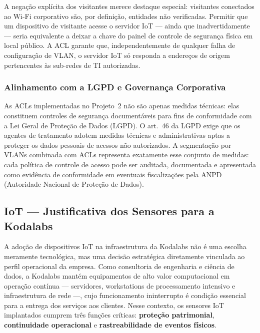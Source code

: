 \documentclass[12pt,a4paper]{article}
\begin{document}
A negação explícita dos visitantes merece destaque especial: visitantes conectados
ao Wi-Fi corporativo são, por definição, entidades não verificadas. Permitir que
um dispositivo de visitante acesse o servidor IoT — ainda que inadvertidamente —
seria equivalente a deixar a chave do painel de controle de segurança física em
local público. A ACL garante que, independentemente de qualquer falha de
configuração de VLAN, o servidor IoT só responda a endereços de origem pertencentes
às sub-redes de TI autorizadas.

\subsubsection{Alinhamento com a LGPD e Governança Corporativa}

As ACLs implementadas no Projeto~2 não são apenas medidas técnicas: elas constituem
controles de segurança documentáveis para fins de conformidade com a Lei Geral de
Proteção de Dados (LGPD). O art.~46 da LGPD exige que os agentes de tratamento
adotem medidas técnicas e administrativas aptas a proteger os dados pessoais de
acessos não autorizados. A segmentação por VLANs combinada com ACLs representa
exatamente esse conjunto de medidas: cada política de controle de acesso pode ser
auditada, documentada e apresentada como evidência de conformidade em eventuais
fiscalizações pela ANPD (Autoridade Nacional de Proteção de Dados).

\subsection{IoT — Justificativa dos Sensores para a Kodalabs}

A adoção de dispositivos IoT na infraestrutura da Kodalabs não é uma escolha
meramente tecnológica, mas uma decisão estratégica diretamente vinculada ao perfil
operacional da empresa. Como consultoria de engenharia e ciência de dados, a
Kodalabs mantém equipamentos de alto valor computacional em operação contínua —
servidores, workstations de processamento intensivo e infraestrutura de rede —,
cujo funcionamento ininterrupto é condição essencial para a entrega dos serviços
aos clientes. Nesse contexto, os sensores IoT implantados cumprem três funções
críticas: \textbf{proteção patrimonial}, \textbf{continuidade operacional} e
\textbf{rastreabilidade de eventos físicos}.
\end{document}
